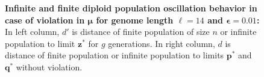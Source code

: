 \begin{figure}[h]
\begin{center}
\hspace{-3em}%
\vspace{-0.5em}  \hspace{-3em}%


\caption{\textbf{Infinite and finite diploid population oscillation behavior in case of violation in $\bm{\mu}$ for genome length $\ell = 14$ and $\bm{\epsilon} = 0.01$:} 
  In left column, $d'$ is distance of finite population of size $n$ or infinite population to limit $\bm{z}^\ast$ for $g$ generations. In right column, $d$ is distance of finite population or infinite population to limits $\bm{p}^\ast$ and $\bm{q}^\ast$ without violation.}
\label{oscillation_14d_vio_mu_0.01}
\end{center}
\end{figure}

